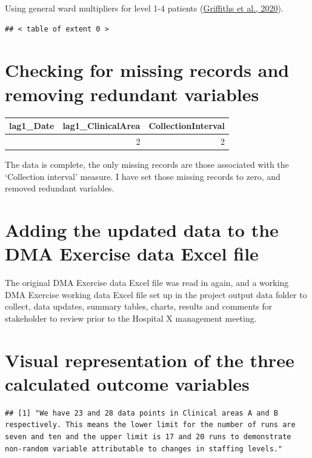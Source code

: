\documentclass[
]{article}
\begin{document}
Using general ward multipliers for level 1-4 patients
(\protect\hyperlink{ref-griffiths2020SaferNursingCare}{Griffiths et al.,
2020}).

\begin{verbatim}
## < table of extent 0 >
\end{verbatim}

\hypertarget{checking-for-missing-records-and-removing-redundant-variables}{%
\section{Checking for missing records and removing redundant
variables}\label{checking-for-missing-records-and-removing-redundant-variables}}

\begin{longtable}[]{@{}rrr@{}}
\toprule\noalign{}
lag1\_Date & lag1\_ClinicalArea & CollectionInterval \\
\midrule\noalign{}
\endhead
\bottomrule\noalign{}
\endlastfoot
2 & 2 & 2 \\
\end{longtable}

The data is complete, the only missing records are those associated with
the `Collection interval' measure. I have set those missing records to
zero, and removed redundant variables.

\hypertarget{adding-the-updated-data-to-the-dma-exercise-data-excel-file}{%
\section{Adding the updated data to the DMA Exercise data Excel
file}\label{adding-the-updated-data-to-the-dma-exercise-data-excel-file}}

The original DMA Exercise data Excel file was read in again, and a
working DMA Exercise working data Excel file set up in the project
output data folder to collect, data updates, summary tables, charts,
results and comments for stakeholder to review prior to the Hospital X
management meeting.

\hypertarget{visual-representation-of-the-three-calculated-outcome-variables}{%
\section{Visual representation of the three calculated outcome
variables}\label{visual-representation-of-the-three-calculated-outcome-variables}}

\begin{verbatim}
## [1] "We have 23 and 28 data points in Clinical areas A and B respectively. This means the lower limit for the number of runs are seven and ten and the upper limit is 17 and 20 runs to demonstrate non-random variable attributable to changes in staffing levels."
\end{verbatim}
\end{document}

